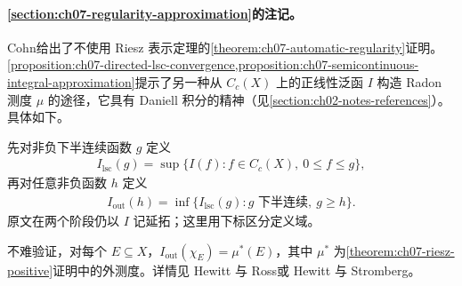 \documentclass[../../main.tex]{subfiles}
\begin{document}
\paragraph*{\cref{section:ch07-regularity-approximation}的注记。}
Cohn\cite[命题 7.2.3]{folland-bib-027}给出了不使用 Riesz 表示定理的\cref{theorem:ch07-automatic-regularity}证明。
\cref{proposition:ch07-directed-lsc-convergence,proposition:ch07-semicontinuous-integral-approximation}提示了另一种从 $C_c(X)$ 上的正线性泛函 $I$ 构造 Radon 测度 $\mu$ 的途径，它具有 Daniell 积分的精神（见\cref{section:ch02-notes-references}）。具体如下。
\begin{definition*}[由正泛函作两次延拓]
先对非负下半连续函数 $g$ 定义
\begin{align*}
I_{\mathrm{lsc}}(g)=\sup\{I(f):f\in C_c(X),\ 0\leqslant f\leqslant g\},
\end{align*}
再对任意非负函数 $h$ 定义
\begin{align*}
I_{\mathrm{out}}(h)=\inf\{I_{\mathrm{lsc}}(g):g\text{ 下半连续},\ g\geqslant h\}.
\end{align*}
原文在两个阶段仍以 $I$ 记延拓；这里用下标区分定义域。
\end{definition*}
不难验证，对每个 $E\subseteq X$，$I_{\mathrm{out}}(\chi_E)=\mu^*(E)$，其中 $\mu^*$ 为\cref{theorem:ch07-riesz-positive}证明中的外测度。详情见 Hewitt 与 Ross\cite{folland-bib-075}或 Hewitt 与 Stromberg\cite{folland-bib-076}。
\end{document}
